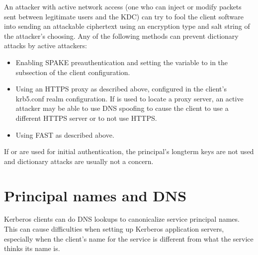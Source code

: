 \documentclass[letterpaper,10pt,english]{sphinxmanual}
\begin{document}
\sphinxAtStartPar
An attacker with active network access (one who can inject or modify
packets sent between legitimate users and the KDC) can try to fool the
client software into sending an attackable ciphertext using an
encryption type and salt string of the attacker’s choosing.  Any of the
following methods can prevent dictionary attacks by active attackers:
\begin{itemize}
\item {} 
\sphinxAtStartPar
Enabling SPAKE preauthentication and setting the
 variable to  in the
{\hyperref[\detokenize{admin/conf_files/krb5_conf:realms}]{}} subsection of the client configuration.

\item {} 
\sphinxAtStartPar
Using an HTTPS proxy as described above, configured in the client’s
krb5.conf realm configuration.  If {\hyperref[\detokenize{admin/realm_config:kdc-discovery}]{}} is used to locate a proxy server, an active
attacker may be able to use DNS spoofing to cause the client to use
a different HTTPS server or to not use HTTPS.

\item {} 
\sphinxAtStartPar
Using FAST as described above.

\end{itemize}

\sphinxAtStartPar
If {\hyperref[\detokenize{admin/pkinit:pkinit}]{}} or {\hyperref[\detokenize{admin/otp:otp-preauth}]{}} are used for
initial authentication, the principal’s long\sphinxhyphen{}term keys are not used
and dictionary attacks are usually not a concern.

\sphinxstepscope


\chapter{Principal names and DNS}
\label{\detokenize{admin/princ_dns:principal-names-and-dns}}\label{\detokenize{admin/princ_dns::doc}}
\sphinxAtStartPar
Kerberos clients can do DNS lookups to canonicalize service principal
names.  This can cause difficulties when setting up Kerberos
application servers, especially when the client’s name for the service
is different from what the service thinks its name is.
\end{document}
